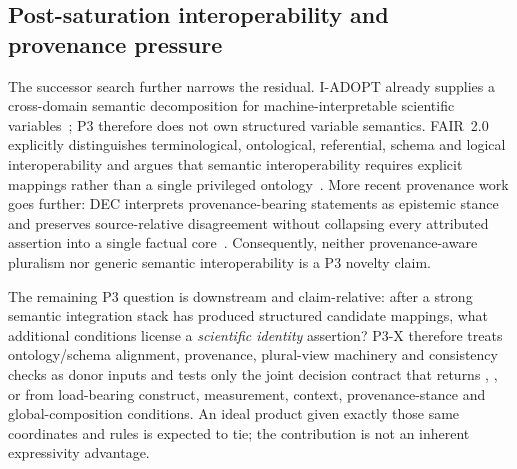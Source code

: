 \subsection{Post-saturation interoperability and provenance pressure}

The successor search further narrows the residual.  I-ADOPT already supplies a
cross-domain semantic decomposition for machine-interpretable scientific
variables~\cite{iadopt2021}; P3 therefore does not own structured variable
semantics.  FAIR~2.0 explicitly distinguishes terminological, ontological,
referential, schema and logical interoperability and argues that semantic
interoperability requires explicit mappings rather than a single privileged
ontology~\cite{fair2_2024}.  More recent provenance work goes further:
DEC interprets provenance-bearing statements as epistemic stance and preserves
source-relative disagreement without collapsing every attributed assertion into
a single factual core~\cite{dec2026}.  Consequently, neither provenance-aware
pluralism nor generic semantic interoperability is a P3 novelty claim.

The remaining P3 question is downstream and claim-relative: after a strong
semantic integration stack has produced structured candidate mappings, what
additional conditions license a \emph{scientific identity} assertion?  P3-X
therefore treats ontology/schema alignment, provenance, plural-view machinery
and consistency checks as donor inputs and tests only the joint decision
contract that returns \glue{}, \obstruction{}, \pluralview{} or \unresolved{}
from load-bearing construct, measurement, context, provenance-stance and
global-composition conditions.  An ideal product given exactly those same
coordinates and rules is expected to tie; the contribution is not an inherent
expressivity advantage.
